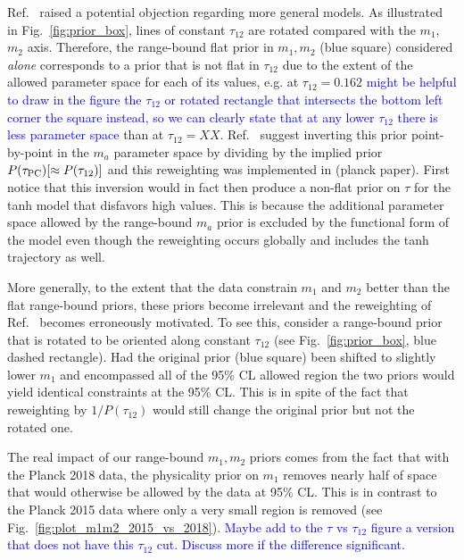 \documentclass[prd,twocolumn,amsmath,amssymb,floatfix,superscriptaddress,nofootinbib]{revtex4-1}
\newcommand{\wh}[1]{\textcolor{blue}{#1}}
\begin{document}
{{Ref.~\cite{Millea:2018bko} raised a potential objection regarding more general models.  As illustrated in Fig.~\ref{fig:prior_box}, lines of constant $\tau_{12}$ are rotated compared with the $m_1$,
$m_2$ axis.  Therefore, the range-bound flat prior in $m_1,m_2$ (blue square) considered {\it alone} corresponds to a prior that is not flat in $\tau_{12}$ due to the extent  of the allowed parameter space
for each of its values, e.g. at $\tau_{12}=0.162$ \wh{might be helpful to draw in the figure the $\tau_{12}$ or rotated rectangle that intersects the
bottom left corner the square instead, so we can clearly state that at any lower $\tau_{12}$ there is less parameter space}
than at $\tau_{12} = XX$.   Ref.~\cite{Millea:2018bko} suggest 
inverting this prior point-by-point in the $m_a$ parameter space by dividing by the implied prior $P(\tau_{\rm PC}) [ \approx P(\tau_{12})]$ and this reweighting was implemented in \cite{} (planck paper).   First notice that this inversion would in fact then produce a non-flat prior on $\tau$ for the tanh model
that disfavors high values.   This is because
the additional parameter space allowed by the range-bound $m_a$ prior is excluded by the functional form of the model even though the reweighting occurs globally and includes the tanh trajectory as well. 

More generally, to the extent that the data constrain $m_1$ and $m_2$ better than the flat range-bound priors, these priors become irrelevant and the reweighting of Ref.~\cite{Millea:2018bko} becomes erroneously motivated.   To see this, consider a range-bound prior that is rotated to be oriented along constant $\tau_{12}$ (see Fig.~\ref{fig:prior_box}, blue dashed rectangle).
Had the original prior (blue square) been shifted to slightly lower
$m_1$ and encompassed all of the 95\% CL allowed
region the two priors would yield  identical constraints at the
95\% CL.   This is in spite of the fact that reweighting by $1/P(\tau_{12})$ would still change the original prior but not the
rotated one.  

The real impact of our range-bound $m_1,m_2$ priors comes from the fact that with the Planck 2018 data, the physicality prior on $m_1$
removes nearly half of space that would otherwise be allowed by the
data at 95\% CL.  This is in contrast to the Planck 2015 data where only a very small region is removed (see Fig.~\ref{fig:plot_m1m2_2015_vs_2018}).  \wh{Maybe add to the $\tau$ vs $\tau_{12}$ figure a version that does not have this $\tau_{12}$ cut.  Discuss more if the difference significant}.

}}
\end{document}
